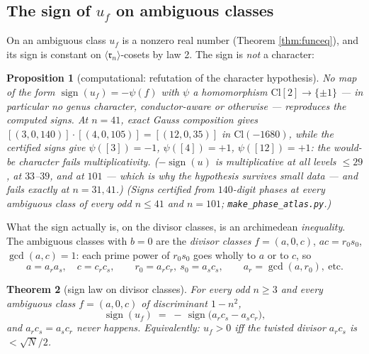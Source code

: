 \documentclass[11pt]{amsart}
\numberwithin{equation}{section}
\theoremstyle{plain}
\newtheorem{theorem}{Theorem}[section]
\newtheorem{proposition}[theorem]{Proposition}
\theoremstyle{definition}
\theoremstyle{remark}
\newcommand{\Cl}{\mathrm{Cl}}
\newcommand{\idealr}{\mathfrak{r}}
\newcommand{\sgn}{\operatorname{sign}}
\begin{document}
\subsection{The sign of $u_f$ on ambiguous classes}\label{subsec:sign}

On an ambiguous class $u_f$ is a nonzero real number (Theorem
\ref{thm:funceq}), and its sign is constant on
$\langle\idealr_n\rangle$-cosets by law 2.  The sign is \emph{not} a
character:

\begin{proposition}[computational: refutation of the character
hypothesis]\label{prop:notcharacter}
No map of the form $\sgn(u_f) = -\psi(f)$ with $\psi$ a homomorphism
$\Cl[2] \to \{\pm 1\}$ --- in particular no genus character,
conductor-aware or otherwise --- reproduces the computed signs.  At
$n = 41$, exact Gauss composition gives $[(3, 0, 140)]\cdot[(4, 0,
105)] = [(12, 0, 35)]$ in $\Cl(-1680)$, while the certified signs give
$\psi([3]) = -1$, $\psi([4]) = +1$, $\psi([12]) = +1$: the would-be
character fails multiplicativity.  ($-\sgn(u)$ \emph{is}
multiplicative at all levels $\le 29$, at $33$--$39$, and at $101$ ---
which is why the hypothesis survives small data --- and fails exactly
at $n = 31, 41$.)  \emph{(Signs certified from $140$-digit phases at
every ambiguous class of every odd $n \le 41$ and $n = 101$;
\texttt{make\_phase\_atlas.py}.)}
\end{proposition}

What the sign actually is, on the divisor classes, is an archimedean
\emph{inequality}.  The ambiguous classes with $b = 0$ are the
\emph{divisor classes} $f = (a, 0, c)$, $ac = r_0s_0$,
$\gcd(a, c) = 1$: each prime power of $r_0s_0$ goes wholly to $a$ or
to $c$, so
\[
  a = a_ra_s, \quad c = c_rc_s, \qquad r_0 = a_rc_r,\ s_0 = a_sc_s,
  \qquad a_r = \gcd(a, r_0),\ \text{etc.}
\]

\begin{theorem}[sign law on divisor classes]\label{thm:signlaw}
For every odd $n \ge 3$ and every ambiguous class $f = (a, 0, c)$ of
discriminant $1 - n^2$,
\[
  \sgn(u_f) \;=\; -\,\sgn\bigl(a_rc_s - a_sc_r\bigr),
\]
and $a_rc_s = a_sc_r$ never happens.  Equivalently: $u_f > 0$ iff the
twisted divisor $a_rc_s$ is $< \sqrt{N}/2$.
\end{theorem}
\end{document}
